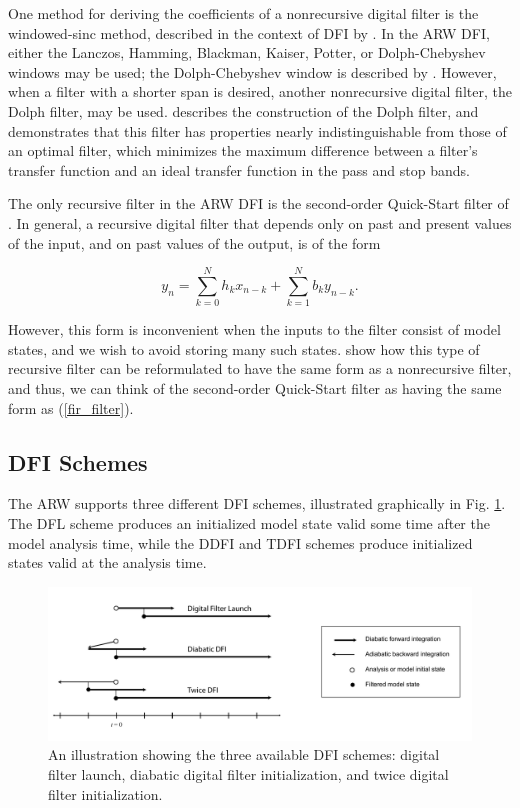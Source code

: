 One method for deriving the coefficients of a nonrecursive digital filter is 
the windowed-sinc method, described in the context of DFI by \cite{lynchhuang92}. 
In the ARW DFI, either the Lanczos, Hamming, Blackman, Kaiser, Potter, or 
Dolph-Chebyshev windows may be used; the Dolph-Chebyshev window is described 
by \cite{lynch97}. However, when a filter with a shorter span is desired, 
another nonrecursive digital filter, the Dolph filter, may be used. \cite{lynch97} 
describes the construction of the Dolph filter, and demonstrates that this 
filter has properties nearly indistinguishable from those of an optimal filter, 
which minimizes the maximum difference between a filter's transfer function 
and an ideal transfer function in the pass and stop bands. 

The only recursive filter in the ARW DFI is the second-order Quick-Start 
filter of \cite{lynchhuang94}. In general, a recursive digital filter that 
depends only on past and present values of the input, and on past values of 
the output, is of the form

\begin{equation}
y_n = \sum_{k=0}^{N} h_k x_{n-k} + \sum_{k=1}^{N} b_k y_{n-k}.
\end{equation}

\noindent
However, this form is inconvenient when the inputs to the filter consist of 
model states, and we wish to avoid storing many such states. \cite{lynchhuang94} 
show how this type of recursive filter can be reformulated to have the same 
form as a nonrecursive filter, and thus, we can think of the second-order 
Quick-Start filter as having the same form as (\ref{fir_filter}).

\subsection{DFI Schemes}

The ARW supports three different DFI schemes, illustrated graphically in 
Fig. \ref{figure:dfi_types}. The DFL scheme produces an initialized model 
state valid some time after the model analysis time, while the DDFI and TDFI 
schemes produce initialized states valid at the analysis time.

%
%
\begin{figure}
  \centering
  \includegraphics[width=6.5in]{figures/dfi_schemes.pdf}
  \caption{\label{figure:dfi_types}An illustration showing the three available DFI schemes: digital filter 
  launch, diabatic digital filter initialization, and twice digital filter initialization.}
\end{figure}

